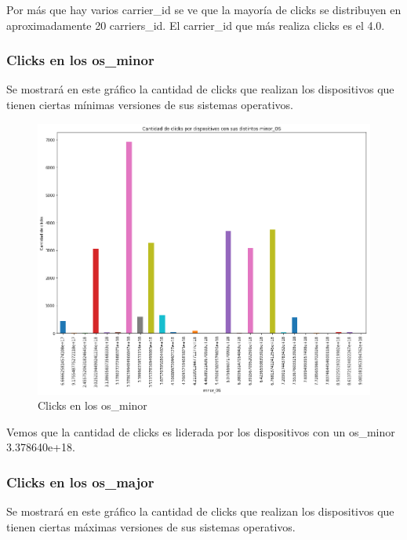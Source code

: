 \documentclass[a4paper, 12pt]{article}
\begin{document}
		 Por más que hay varios carrier\_id se ve que la mayoría de clicks se distribuyen en aproximadamente 20 carriers\_id. El carrier\_id que más realiza clicks es el 4.0.

	\subsubsection{Clicks en los os\_minor}
		 Se mostrará en este gráfico la cantidad de clicks que realizan los dispositivos que tienen ciertas mínimas versiones de sus sistemas operativos.

		
		\begin{figure}[H]
			\centering
			\includegraphics[scale = 0.37]{images/clicks/clicks_minor_OS.png}
			\caption{Clicks en los os\_minor}
		\end{figure}
		

		 Vemos que la cantidad de clicks es liderada por los dispositivos con un os\_minor 3.378640e+18.

	\subsubsection{Clicks en los os\_major}
		 Se mostrará en este gráfico la cantidad de clicks que realizan los dispositivos que tienen ciertas máximas
		versiones de sus sistemas operativos.
\end{document}
